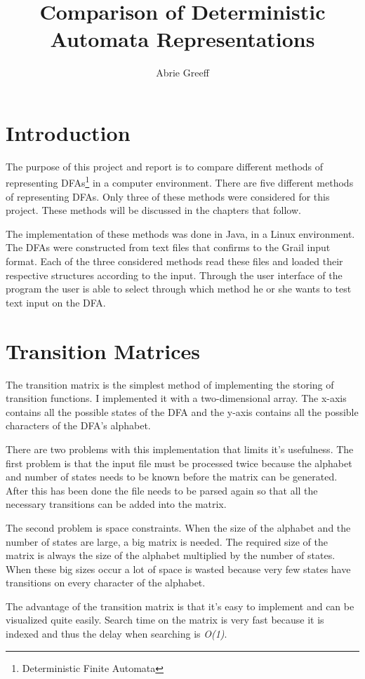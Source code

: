 \documentclass[a4paper,11pt,titlepage]{article}
\author{Abrie Greeff}
\title{Comparison of Deterministic Automata Representations}
\begin{document}
\maketitle
\tableofcontents
\pagebreak
\section{Introduction}
The purpose of this project and report is to compare different methods of representing DFAs\footnote{Deterministic Finite Automata} in a computer environment. There are five different methods of representing DFAs. Only three of these methods were considered for this project. These methods will be discussed in the chapters that follow.

The implementation of these methods was done in Java, in a Linux environment. The DFAs were constructed from text files that confirms to the Grail input format. Each of the three considered methods read these files and loaded their respective structures according to the input. Through the user interface of the program the user is able to select through which method he or she wants to test text input on the DFA.
\pagebreak
\section{Transition Matrices}
The transition matrix is the simplest method of implementing the storing of  transition functions. I implemented it with a two-dimensional array. The x-axis contains all the possible states of the DFA and the y-axis contains all the possible characters of the DFA's alphabet. 

There are two problems with this implementation that limits it's usefulness. The first problem is that the input file must be processed twice because the alphabet and number of states needs to be known before the matrix can be generated. After this has been done the file needs to be parsed again so that all the necessary transitions can be added into the matrix.

The second problem is space constraints. When the size of the alphabet and the number of states are large, a big matrix is needed. The required size of the matrix is always the size of the alphabet multiplied by the number of states. When these big sizes occur a lot of space is wasted because very few states have transitions on every character of the alphabet.

The advantage of the transition matrix is that it's easy to implement and can be visualized quite easily. Search time on the matrix is very fast because it is indexed and thus the delay when searching is \textit{O(1)}.
\pagebreak
\end{document}
